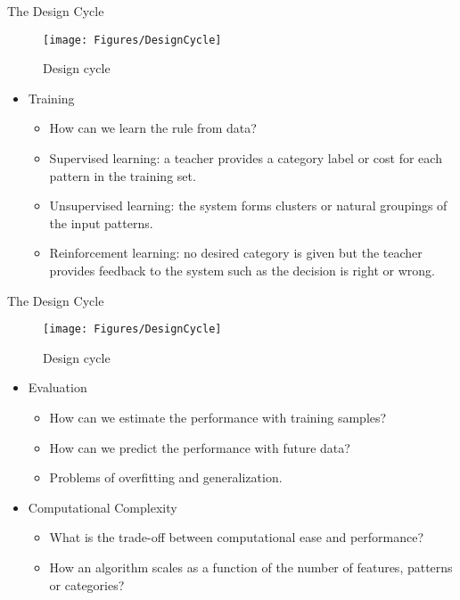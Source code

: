 \begin{frame}{The Design Cycle}
\begin{figure}
\texttt{[image: Figures/DesignCycle]}
\caption{Design cycle}
\end{figure}
\vspace{-12pt}
\begin{itemize}
\item {\color{mycolor2}Training}
\begin{itemize}
\item How can we learn the rule from data?
\item Supervised learning: a teacher provides a category label or
cost for each pattern in the training set.
\item Unsupervised learning: the system forms clusters or natural groupings of the input patterns.
\item Reinforcement learning: no desired category is given but the teacher provides feedback to the system such as the decision is right or wrong.
\end{itemize}
\end{itemize}
\end{frame}

\begin{frame}{The Design Cycle}
\begin{figure}
\texttt{[image: Figures/DesignCycle]}
\caption{Design cycle}
\end{figure}
\vspace{-12pt}
\begin{itemize}
\setlength{\itemsep}{12pt}
\item {\color{mycolor2}Evaluation}
\begin{itemize}
\setlength{\itemsep}{2pt}
\item How can we estimate the performance with training
samples?
\item How can we predict the performance with future data?
\item Problems of overfitting and generalization.
\end{itemize}
\item {\color{mycolor2}Computational Complexity}
\begin{itemize}
\setlength{\itemsep}{2pt}
\item What is the trade-off between computational ease and performance?
\item How an algorithm scales as a function of the number of features, patterns or categories?
\end{itemize}
\end{itemize}
\end{frame}

